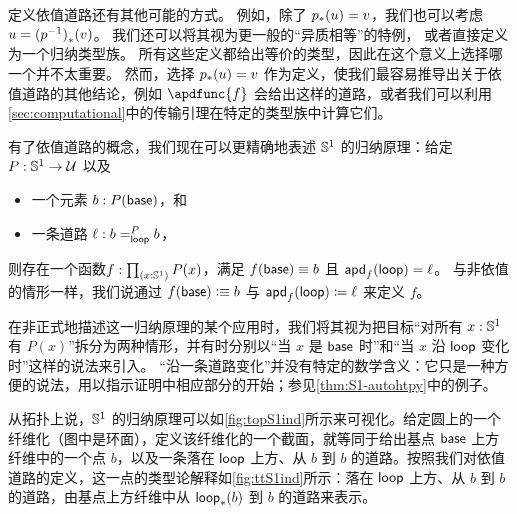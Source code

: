 \begin{rmk}
定义依值道路还有其他可能的方式。
例如，除了 $\trans p u = v$，我们也可以考虑$u = \trans{(\opp p)}{v}$。
我们还可以将其视为更一般的``异质相等''的特例，
%
%
或者直接定义为一个归纳类型族。
所有这些定义都给出等价的类型，因此在这个意义上选择哪一个并不太重要。
然而，选择 $\trans p u = v$ 作为定义，使我们最容易推导出关于依值道路的其他结论，例如 $\apdfunc{f}$ 会给出这样的道路，或者我们可以利用\cref{sec:computational}中的传输引理在特定的类型族中计算它们。
\end{rmk}

有了依值道路的概念，我们现在可以更精确地表述 $\Sn^1$ 的归纳原理：给定 $P:\Sn^1\to\type$ 以及
\begin{itemize}
\item 一个元素 $b:P(\base)$，和
\item 一条道路 $\ell : \dpath P \lloop b b$，
\end{itemize}
则存在一个函数$f:\prd{x:\Sn^1} P(x)$，满足 $f(\base)\jdeq b$ 且 $\apd f \lloop = \ell$。
与非依值的情形一样，我们说通过 $f(\base)\defeq b$ 与 $\apd f \lloop \defid \ell$ 来定义 $f$。

\begin{rmk}\label{rmk:varies-along}
在非正式地描述这一归纳原理的某个应用时，我们将其视为把目标``对所有 $x:\Sn^1$ 有 $P(x)$''拆分为两种情形，并有时分别以``当 $x$ 是 $\base$ 时''和``当 $x$ 沿 $\lloop$ 变化时''这样的说法来引入。
``沿一条道路变化''并没有特定的数学含义：它只是一种方便的说法，用以指示证明中相应部分的开始；参见\cref{thm:S1-autohtpy}中的例子。
%
\end{rmk}

从拓扑上说，$\Sn^1$ 的归纳原理可以如\cref{fig:topS1ind}所示来可视化。给定圆上的一个纤维化（图中是环面），定义该纤维化的一个截面，就等同于给出基点 $\base$ 上方纤维中的一个点 $b$，以及一条落在 $\lloop$ 上方、从 $b$ 到 $b$ 的道路。按照我们对依值道路的定义，这一点的类型论解释如\cref{fig:ttS1ind}所示：落在 $\lloop$ 上方、从 $b$ 到 $b$ 的道路，由基点上方纤维中从 $\trans \lloop b$ 到 $b$ 的道路来表示。

